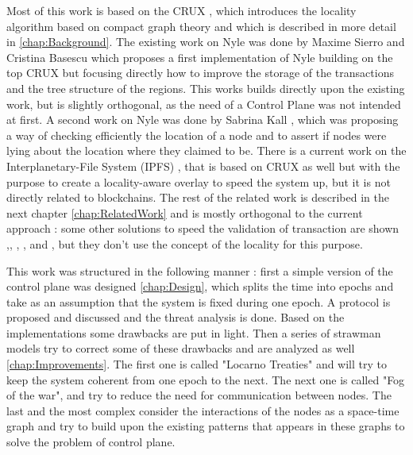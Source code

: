 \documentclass[a4paper,11pt,oneside]{report}
\begin{document}
Most of this work is based on the CRUX \cite{basescu2014crux}, which introduces
the locality algorithm based on compact graph theory and which is described in
more detail in  \ref{chap:Background}. The existing work on Nyle was done by
Maxime Sierro and Cristina Basescu \cite{MaximeSierro} which proposes a first
implementation of Nyle building on the top CRUX \cite{CRUX} but focusing
directly how to improve the storage of the transactions and the tree structure
of the regions. This works builds directly upon the existing work, but is
slightly orthogonal, as the need of a Control Plane was not intended at first.
A  second work on Nyle was done by Sabrina Kall \cite{SabrinaKall}, which was
proposing a way of checking efficiently the location of a node and to assert if
nodes were lying about the location where they claimed to be. There is a
current work on the Interplanetary-File System (IPFS) \cite{IPFS}, that is
based on CRUX as well but with the purpose to create a locality-aware overlay
to speed the system up, but it is not directly related to blockchains. The rest
of the related work is described in the next chapter \ref{chap:RelatedWork} and
is mostly orthogonal to the current approach : some other solutions to speed
the validation of transaction are shown \cite{bitcoin-paper},\cite{Byzcoin},
\cite{Omniledger}, \cite{Dfinity}, \cite{Monoxide} and \cite{Stellar}, but they
don't use the concept of the locality for this purpose. 

This work was structured in the following manner : first a simple version of
the control plane was designed \ref{chap:Design}, which splits the time into
epochs and take as an assumption that the system is fixed during one epoch. A
protocol is proposed and discussed and the threat analysis is done. Based on
the implementations some drawbacks are put in light. Then a series of strawman
models try to correct some of these drawbacks and are analyzed as well
\ref{chap:Improvements}. The first one is called "Locarno Treaties" and will
try to keep the system coherent from one epoch to the next. The next one is
called "Fog of the war", and try to reduce the need for communication between
nodes. The last and the most complex consider the interactions of the nodes as
a space-time graph and try to build upon the existing patterns that appears in
these graphs to solve the problem of control plane. 

\end{document}
